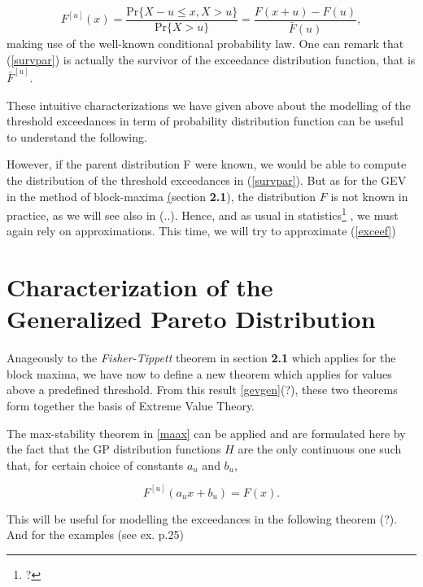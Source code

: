 \begin{equation}\label{exceef}
F^{[u]}(x)=\frac{\text{Pr}\{X-u\leq 
x,X>u\}}{\text{Pr}\{X>u\}}=\frac{F(x+u)-F(u)}{\bar{F}(u)},
\end{equation}
making use of the well-known conditional probability law. One can remark that (\ref{survpar}) is actually the survivor of the exceedance distribution function, that is $\bar{F}^{[u]}$.

These intuitive characterizations we have given above about the modelling of the threshold exceedances in term of probability distribution function can be useful to understand the following. 

However, if the parent distribution F were known, we would be able to compute the distribution of the threshold exceedances in (\ref{survpar}). \cite[pp.74]{coles_introduction_2001} But as for the GEV in the method of block-maxima \hyperref[](section \textbf{2.1}), the distribution $F$ is not known in practice, as we will see also in (..). Hence, and as usual in statistics\footnote{?}%
, we must again rely on approximations. This time, we will try to approximate (\ref{exceef})

\section{Characterization of the Generalized Pareto Distribution}

Anageously to the \emph{Fisher-Tippett} theorem in section \textbf{2.1} which applies for the block maxima, we have now to define a new theorem which applies for values above a predefined threshold. From this result \ref{gevgen}(?), these two theorems form together the basis of Extreme Value Theory.

\begin{theorem}\emph{\citet[pp.25]{reiss_statistical_2007}} The max-stability theorem in \ref{maax} can be applied and are formulated here by the fact that the GP distribution functions $H$ are the only continuous one such that, for certain choice of constants $a_u$ and $b_u$, 
	
	\begin{equation*}
	F^{[u]}(a_ux+b_u)=F(x).
	\end{equation*}
\end{theorem}
This will be useful for modelling the exceedances in the following theorem (?). And for the examples (see ex. p.25)

